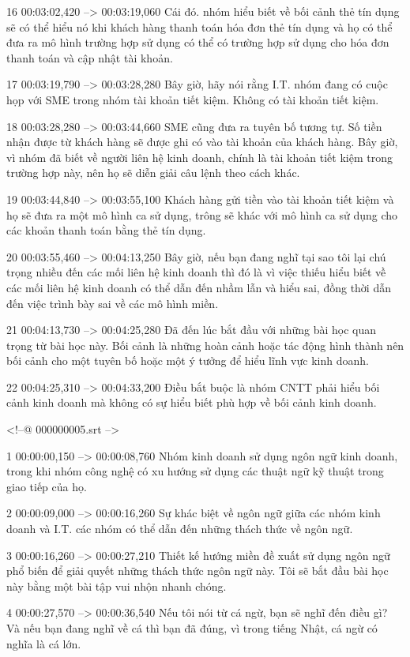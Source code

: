 16
00:03:02,420 --> 00:03:19,060
Cái đó.  nhóm hiểu biết về bối cảnh thẻ tín dụng sẽ có thể hiểu nó khi khách hàng thanh toán hóa đơn thẻ tín dụng và họ có thể đưa ra mô hình trường hợp sử dụng có thể có trường hợp sử dụng cho hóa đơn thanh toán và cập nhật tài khoản.

17
00:03:19,790 --> 00:03:28,280
Bây giờ, hãy nói rằng I.T.  nhóm đang có cuộc họp với SME trong nhóm tài khoản tiết kiệm.  Không có tài khoản tiết kiệm.

18
00:03:28,280 --> 00:03:44,660
SME cũng đưa ra tuyên bố tương tự.  Số tiền nhận được từ khách hàng sẽ được ghi có vào tài khoản của khách hàng.  Bây giờ, vì nhóm đã biết về người liên hệ kinh doanh, chính là tài khoản tiết kiệm trong trường hợp này, nên họ sẽ diễn giải câu lệnh theo cách khác.

19
00:03:44,840 --> 00:03:55,100
Khách hàng gửi tiền vào tài khoản tiết kiệm và họ sẽ đưa ra một mô hình ca sử dụng, trông sẽ khác với mô hình ca sử dụng cho các khoản thanh toán bằng thẻ tín dụng.

20
00:03:55,460 --> 00:04:13,250
Bây giờ, nếu bạn đang nghĩ tại sao tôi lại chú trọng nhiều đến các mối liên hệ kinh doanh thì đó là vì việc thiếu hiểu biết về các mối liên hệ kinh doanh có thể dẫn đến nhầm lẫn và hiểu sai, đồng thời dẫn đến việc trình bày sai về các mô hình miền.

21
00:04:13,730 --> 00:04:25,280
Đã đến lúc bắt đầu với những bài học quan trọng từ bài học này.  Bối cảnh là những hoàn cảnh hoặc tác động hình thành nên bối cảnh cho một tuyên bố hoặc một ý tưởng để hiểu lĩnh vực kinh doanh.

22
00:04:25,310 --> 00:04:33,200
Điều bắt buộc là nhóm CNTT phải hiểu bối cảnh kinh doanh mà không có sự hiểu biết phù hợp về bối cảnh kinh doanh.

<!--@ 000000005.srt -->

1
00:00:00,150 --> 00:00:08,760
Nhóm kinh doanh sử dụng ngôn ngữ kinh doanh, trong khi nhóm công nghệ có xu hướng sử dụng các thuật ngữ kỹ thuật trong giao tiếp của họ.

2
00:00:09,000 --> 00:00:16,260
Sự khác biệt về ngôn ngữ giữa các nhóm kinh doanh và I.T.  các nhóm có thể dẫn đến những thách thức về ngôn ngữ.

3
00:00:16,260 --> 00:00:27,210
Thiết kế hướng miền đề xuất sử dụng ngôn ngữ phổ biến để giải quyết những thách thức ngôn ngữ này.  Tôi sẽ bắt đầu bài học này bằng một bài tập vui nhộn nhanh chóng.

4
00:00:27,570 --> 00:00:36,540
Nếu tôi nói từ cá ngừ, bạn sẽ nghĩ đến điều gì?  Và nếu bạn đang nghĩ về cá thì bạn đã đúng, vì trong tiếng Nhật, cá ngừ có nghĩa là cá lớn.


